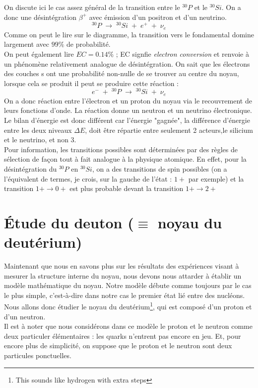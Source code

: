 On discute ici le cas assez général de la transition entre le $^{30}P$ et le $^{30}Si$. On a donc une désintégration $\beta^+$ avec émission d'un positron et d'un neutrino.
\[
    ^{30}P \; \longrightarrow \; ^{30}Si \; + \; e^+ \; + \; \nu_e
\]
Comme on peut le lire sur le diagramme, la transition vers le fondamental domine largement avec $99\%$ de probabilité.\\
On peut également lire $EC = 0.14\%$ ; EC signfie \emph{electron conversion} et renvoie à un phénomène relativement analogue de désintégration. On sait que les électrons des couches s ont une probabilité non-nulle de se trouver au centre du noyau, lorsque cela se produit il peut se produire cette réaction :
\[
    e^- \; + \; ^{30}P \; \longrightarrow \; ^{30}Si \; + \; \nu_e
\]
On a donc réaction entre l'électron et un proton du noyau via le recouvrement de leurs fonctions d'onde. La réaction donne un neutron et un neutrino électronique. Le bilan d'énergie est donc différent car l'énergie "gagnée", la différence d'énergie entre les deux niveaux $\Delta E$, doit être répartie entre seulement 2 acteurs,le silicium et le neutrino, et non 3.\\
Pour information, les transitions possibles sont déterminées par des règles de sélection de façon tout à fait analogue à la physique atomique. En effet, pour la désintégration du $^{30}P$ en $^{30}Si$, on a des transitions de spin possibles (on a l'équivalent de termes, je crois, sur la gauche de l'état : $1+$ par exemple) et la transition $1+ \rightarrow 0+$ est plus probable devant la transition $1+ \rightarrow 2+$















\section{Étude du deuton ($\equiv$ noyau du deutérium)}

Maintenant que nous en savons plus sur les résultats des expériences visant à mesurer la structure interne du noyau, nous devons nous attarder à établir un modèle mathématique du noyau. Notre modèle débute comme toujours par le cas le plus simple, c'est-à-dire dans notre cas le premier état lié entre des nucléons. Nous allons donc étudier le noyau du deutérium\footnote{This sounds like hydrogen with extra steps}, qui est composé d'un proton et d'un neutron.\\
Il est à noter que nous considérons dans ce modèle le proton et le neutron comme deux particuler élémentaires : les quarks n'entrent pas encore en jeu. Et, pour encore plus de simplicité, on suppose que le proton et le neutron sont deux particules ponctuelles.\\


